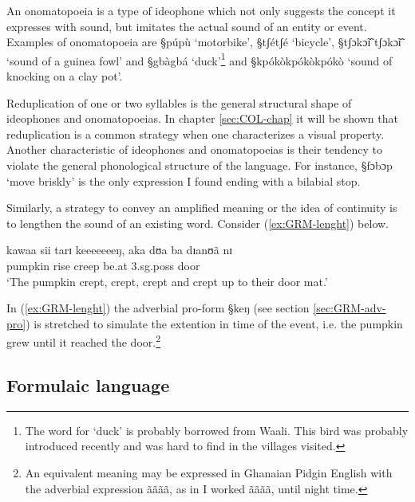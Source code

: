 An onomatopoeia is a type of ideophone which not only suggests the concept  it
expresses with sound, but imitates  the actual sound of an entity or event.
Examples of onomatopoeia are {\S púpù} `motorbike', {\S tʃétʃé} `bicycle',
{\S tʃɔkɔ̃ɪ̃ tʃɔkɔ̃ɪ̃} `sound
of a guinea fowl' and {\S gbàgbá}  `duck'\footnote{The word for `duck' is
probably 
borrowed from Waali.
This bird was probably introduced recently and was hard to find in the
villages
visited.}  and {\S kpókòkpókòkpókò} `sound of knocking on a clay pot'.


Reduplication of one or two syllables is the general structural shape of
ideophones and onomatopoeias. In chapter \ref{sec:COL-chap} it will be shown
that  reduplication is a common strategy when one characterizes a visual
property. Another characteristic of ideophones and onomatopoeias  is their
tendency to violate the general
phonological structure of the language.  For instance,  {\S fɔbɔp} `move
briskly'  is the only expression I found ending with a bilabial stop. 

Similarly, a strategy to convey an amplified meaning or the idea of
continuity is to lengthen the sound of an existing word. Consider 
(\ref{ex:GRM-lenght}) below.

\begin{exe}
 \ex\label{ex:GRM-lenght}
   \gll  kawaa sii tarɪ keeeeeeeŋ, aka dʊa  ba dɪanʊã nɪ\\
pumpkin rise {creep} {\advm} {\conn} {be.at} {\sc 3.sg.poss} door {\postp}\\
\glt `The pumpkin crept, crept, crept and crept up to their
door mat.'
\end{exe}

In (\ref{ex:GRM-lenght}) the adverbial pro-form {\S keŋ} (see section
\ref{sec:GRM-adv-pro}) is stretched to simulate the extention in time of the
event, i.e. the pumpkin grew until it reached the door.\footnote{An equivalent
meaning may be expressed in Ghanaian Pidgin English with the adverbial
expression  {\F ãããã}, as in {\F I worked ãããã, until night time.}}


\subsection{Formulaic language}
\label{sec:GRM-greet}


